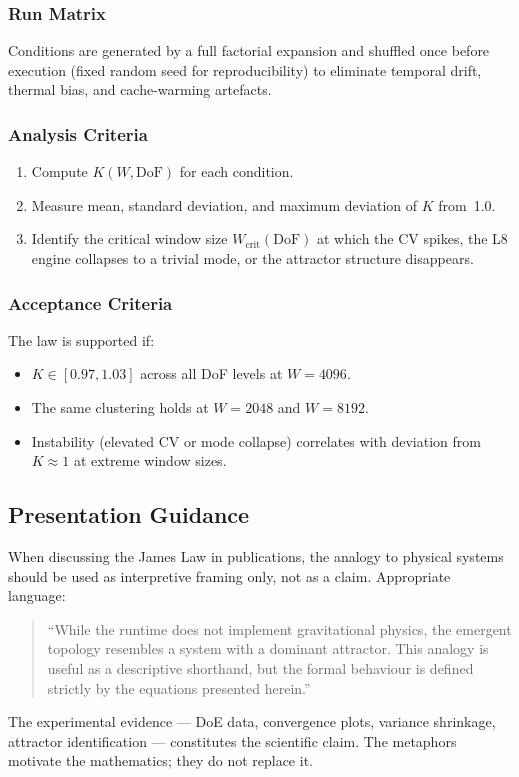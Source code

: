\subsubsection{Run Matrix}

Conditions are generated by a full factorial expansion and shuffled once
before execution (fixed random seed for reproducibility) to eliminate
temporal drift, thermal bias, and cache-warming artefacts.

\subsubsection{Analysis Criteria}

\begin{enumerate}
  \item Compute $K(W, \mathrm{DoF})$ for each condition.
  \item Measure mean, standard deviation, and maximum deviation of $K$
    from~1.0.
  \item Identify the critical window size $W_\mathrm{crit}(\mathrm{DoF})$
    at which the CV spikes, the L8 engine collapses to a trivial mode,
    or the attractor structure disappears.
\end{enumerate}

\subsubsection{Acceptance Criteria}

The law is supported if:
\begin{itemize}
  \item $K \in [0.97, 1.03]$ across all DoF levels at $W = 4096$.
  \item The same clustering holds at $W = 2048$ and $W = 8192$.
  \item Instability (elevated CV or mode collapse) correlates with
    deviation from $K \approx 1$ at extreme window sizes.
\end{itemize}

\subsection{Presentation Guidance}

When discussing the James Law in publications, the analogy to physical
systems should be used as interpretive framing only, not as a claim.
Appropriate language:

\begin{quote}
``While the runtime does not implement gravitational physics, the emergent
topology resembles a system with a dominant attractor. This analogy is
useful as a descriptive shorthand, but the formal behaviour is defined
strictly by the equations presented herein.''
\end{quote}

The experimental evidence — DoE data, convergence plots, variance
shrinkage, attractor identification — constitutes the scientific
claim. The metaphors motivate the mathematics; they do not replace it.
